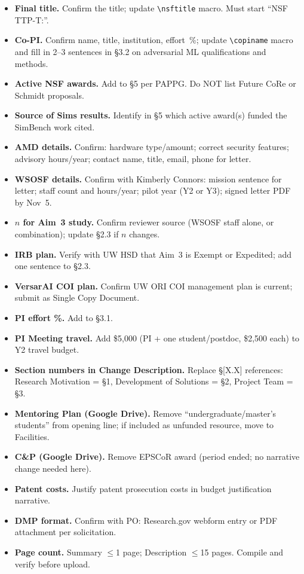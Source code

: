 \documentclass[11pt]{article}
\newcommand{\copiname}{[Co-PI Name, Title, Institution]}
\newcommand{\nsftitle}{NSF TTP-T: Authority-Ranked Arbitration Governance for Organizational AI Agents}
\begin{document}
\begin{itemize}[leftmargin=2em]
  \item[$\square$] \textbf{Final title.} Confirm the title; update \verb|\nsftitle| macro. Must start ``NSF TTP-T:''.
  \item[$\square$] \textbf{Co-PI.} Confirm name, title, institution, effort~\%; update \verb|\copiname| macro and fill in 2--3 sentences in \S3.2 on adversarial ML qualifications and methods.
  \item[$\square$] \textbf{Active NSF awards.} Add to \S5 per PAPPG. Do NOT list Future CoRe or Schmidt proposals.
  \item[$\square$] \textbf{Source of Sims results.} Identify in \S5 which active award(s) funded the SimBench work cited.
  \item[$\square$] \textbf{AMD details.} Confirm: hardware type/amount; correct security features; advisory hours/year; contact name, title, email, phone for letter.
  \item[$\square$] \textbf{WSOSF details.} Confirm with Kimberly Connors: mission sentence for letter; staff count and hours/year; pilot year (Y2 or Y3); signed letter PDF by Nov~5.
  \item[$\square$] \textbf{$n$ for Aim~3 study.} Confirm reviewer source (WSOSF staff alone, or combination); update \S2.3 if $n$ changes.
  \item[$\square$] \textbf{IRB plan.} Verify with UW HSD that Aim~3 is Exempt or Expedited; add one sentence to \S2.3.
  \item[$\square$] \textbf{VersarAI COI plan.} Confirm UW ORI COI management plan is current; submit as Single Copy Document.
  \item[$\square$] \textbf{PI effort \%.} Add to \S3.1.
  \item[$\square$] \textbf{PI Meeting travel.} Add \$5,000 (PI + one student/postdoc, \$2,500 each) to Y2 travel budget.
  \item[$\square$] \textbf{Section numbers in Change Description.} Replace \S[X.X] references: Research Motivation = \S1, Development of Solutions = \S2, Project Team = \S3.
  \item[$\square$] \textbf{Mentoring Plan (Google Drive).} Remove ``undergraduate/master's students'' from opening line; if included as unfunded resource, move to Facilities.
  \item[$\square$] \textbf{C\&P (Google Drive).} Remove EPSCoR award (period ended; no narrative change needed here).
  \item[$\square$] \textbf{Patent costs.} Justify patent prosecution costs in budget justification narrative.
  \item[$\square$] \textbf{DMP format.} Confirm with PO: Research.gov webform entry or PDF attachment per solicitation.
  \item[$\square$] \textbf{Page count.} Summary $\leq$1 page; Description $\leq$15 pages. Compile and verify before upload.
\end{itemize}
\end{document}
